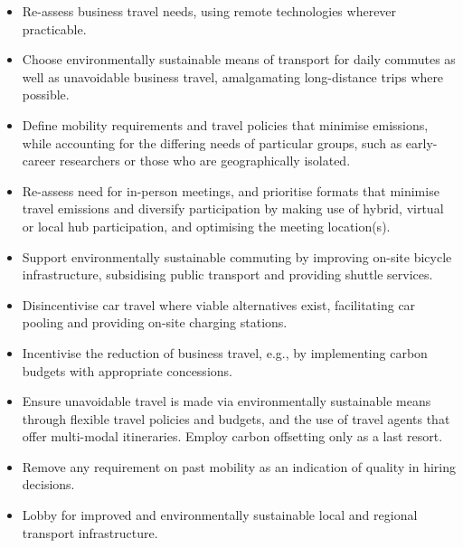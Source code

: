 \documentclass[../SustainableHEP.tex]{subfiles}
\begin{document}
\newpage
\begin{reco2}{\currentname}
{
\begin{itemize}[leftmargin=6 mm]
\item Re-assess business travel needs, using remote technologies wherever practicable.
\item Choose environmentally sustainable means of transport for daily commutes as well as unavoidable business travel, amalgamating long-distance trips where possible.
\end{itemize}
}
{
\begin{itemize}[leftmargin=6 mm]
\item Define mobility requirements and travel policies that minimise emissions, while accounting for the differing needs of particular groups, such as early-career researchers or those who are geographically isolated.

\item Re-assess need for in-person meetings, and prioritise formats that minimise travel emissions and diversify participation by making use of hybrid, virtual or local hub participation, and optimising the meeting location(s).

\end{itemize}
}
{
\begin{itemize}[leftmargin=6 mm]
\item Support environmentally sustainable commuting by improving on-site bicycle infrastructure, subsidising public transport and providing shuttle services.

\item Disincentivise car travel where viable alternatives exist, facilitating car pooling and providing on-site charging stations.

\item Incentivise the reduction of business travel, e.g., by implementing carbon budgets with appropriate concessions.

\item Ensure unavoidable travel is made via environmentally sustainable means through flexible travel policies and budgets, and the use of travel agents that offer multi-modal itineraries.  Employ carbon offsetting only as a last resort.

\item Remove any requirement on past mobility as an indication of quality in hiring decisions. 

\item Lobby for improved and environmentally sustainable local and regional transport infrastructure.

\end{itemize}
}
\end{reco2}
\end{document}
